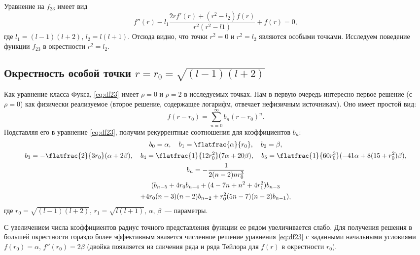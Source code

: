 \documentclass[\docroot/report.tex]{subfiles}
\begin{document}
Уравнение на $f_{23}$ имеет вид
%
\begin{equation}\label{eq:df23}
    f''(r) - l_1 \frac{ 2 r f'(r) + (r^2 - l_2) f(r) }{ r^2 (r^2 - l1) } + f(r) = 0 ,
\end{equation}
%
где $l_1 = (l-1)(l+2)$, $l_2 = l(l+1)$. Отсюда видно, что точки $r^2 = 0$ и $r^2 = l_2$ являются особыми точками. Исследуем поведение функции $f_{23}$ в окрестности $r^2 = l_2$.

%
%
%
%
%
%

\subsection{Окрестность особой точки $r = r_0 = \sqrt{(l-1)(l+2)}$}

Как уравнение класса Фукса, \autoref{eq:df23} имеет $\rho = 0$ и $\rho = 2$ в исследуемых точках. Нам в первую очередь интересно первое решение (с $\rho = 0$) как физически реализуемое (второе решение, содержащее логарифм, отвечает нефизичным источникам). Оно имеет простой вид:
%
\begin{equation}\label{eq:f23-series}
    f(r - r_0) = \sum\limits_{n=0}^\infty b_n (r - r_0)^n .
\end{equation}
%
Подставляя его в уравнение \autoref{eq:df23}, получим рекуррентные соотношения для коэффициентов $b_n$:
%
\begin{equation}\begin{gathered}\label{eq:f23-series-coefs}
    b_0 = \alpha, \quad
    b_1 = \flatfrac{\alpha}{r_0}, \quad
    b_2 = \beta, \\
    b_3 = - \flatfrac{2}{3 r_0} (\alpha + 2 \beta), \quad
    b_4 = \flatfrac{1}{12 r_0^2} (7 \alpha + 20 \beta), \quad
    b_5 = \flatfrac{1}{60 r_0^3} (-41 \alpha + 8 (15 + r_0^2) \beta), \\
    b_n = - \frac{1}{2(n-2)n r_0^3} \\ (b_{n-5} + 4 r_0 b_{n-4}
          + (4-7n+n^2+4r_1^2) b_{n-3} \\ + 4r_0(n-3)(n-2) b_{n-2} + r_0^2(5n-7)(n-2) b_{n-1}),
\end{gathered}\end{equation}
%
где $r_0 = \sqrt{(l-1)(l+2)}$, $r_1 = \sqrt{l(l+1)}$, $\alpha$, $\beta$~--- параметры.

С увеличением числа коэффициентов радиус точного представления функции ее рядом увеличивается слабо. Для получения решения в большей окрестности гораздо более эффективным является численное решение уравнения \autoref{eq:df23} с заданными начальными условиями $f(r_0) = \alpha$, $f''(r_0) = 2\beta$ (двойка появляется из сличения ряда \label{eq:f23-series} и ряда Тейлора для $f(r)$ в окрестности $r_0$).
\end{document}
